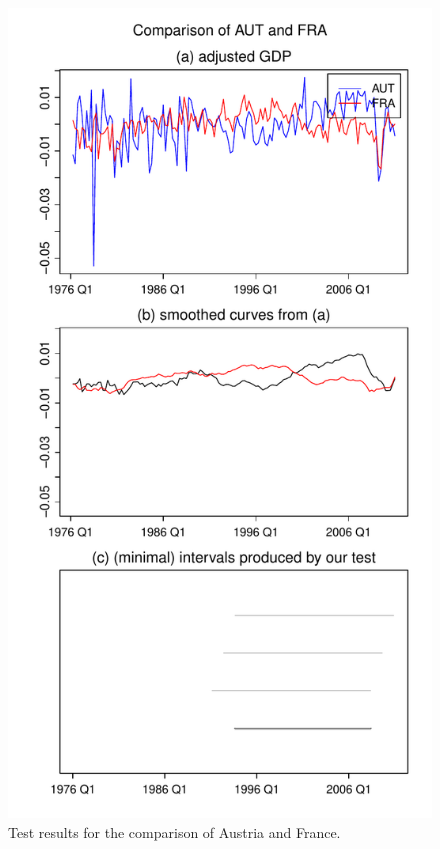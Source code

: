 \documentclass[a4paper,12pt]{article}
\begin{document}
{\begin{figure}[p!]
\begin{minipage}[t]{0.49\textwidth}
\includegraphics[width=\textwidth]{plots/AUT_vs_FRA}
\caption{Test results for the comparison of Austria and France.}\label{fig:Austria:France}
\end{minipage}
\hspace{0.25cm}

\end{figure}}
\end{document}
